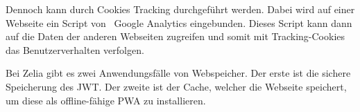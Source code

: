 Dennoch kann durch Cookies Tracking durchgeführt werden. Dabei wird auf einer Webseite ein Script von \zb\ Google Analytics eingebunden. Dieses Script kann dann auf die Daten der anderen Webseiten zugreifen und somit mit Tracking-Cookies das Benutzerverhalten verfolgen.









Bei Zelia gibt es zwei Anwendungsfälle von Webspeicher. Der erste ist die sichere Speicherung des JWT. Der zweite ist der Cache, welcher die Webseite speichert, um diese als offline-fähige PWA zu installieren.

